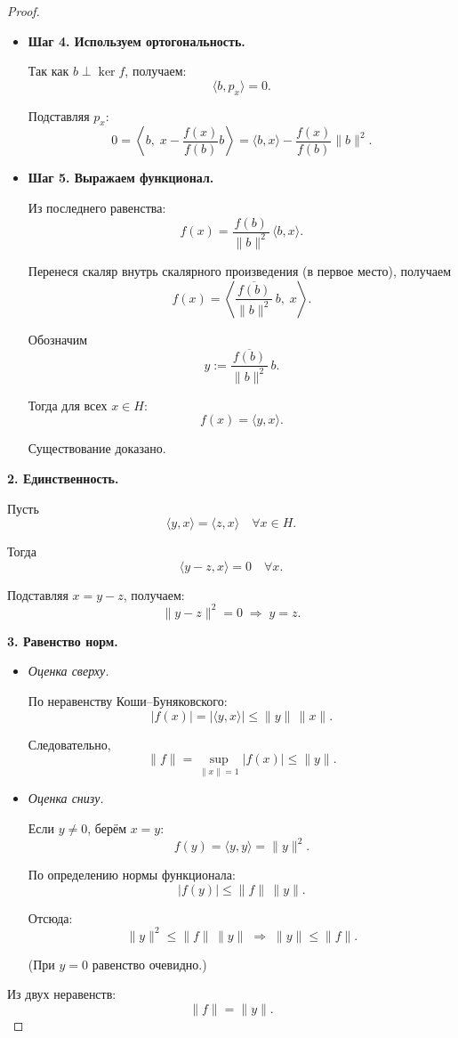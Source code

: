 \begin{proof}
\begin{itemize}
		\medskip
		
		\item \textbf{Шаг 4. Используем ортогональность.}
		
		Так как $b\perp\ker f$, получаем:
		$$
		\langle b,p_x\rangle=0.
		$$
		
		Подставляя $p_x$:
		$$
		0=\left\langle b,\;x-\frac{f(x)}{f(b)}b\right\rangle
		=\langle b,x\rangle-\frac{f(x)}{f(b)}\|b\|^2.
		$$
		
		\medskip
		
		\item \textbf{Шаг 5. Выражаем функционал.}
		
		Из последнего равенства:
		$$
		f(x)=\frac{f(b)}{\|b\|^2}\,\langle b,x\rangle.
		$$
		
		Перенеся скаляр внутрь скалярного произведения (в первое место), получаем
		$$
		f(x)=\left\langle
		\frac{\overline{f(b)}}{\|b\|^2}\,b,\;x
		\right\rangle.
		$$
		
		Обозначим
		$$
		y:=\frac{\overline{f(b)}}{\|b\|^2}\,b.
		$$
		
		Тогда для всех $x\in H$:
		$$
		f(x)=\langle y,x\rangle.
		$$
		
		Существование доказано.
		
	\end{itemize}
	
	\medskip
	
	\textbf{2. Единственность.}
	
	Пусть
	$$
	\langle y,x\rangle=\langle z,x\rangle
	\quad \forall x\in H.
	$$
	
	Тогда
	$$
	\langle y-z,x\rangle=0\quad \forall x.
	$$
	
	Подставляя $x=y-z$, получаем:
	$$
	\|y-z\|^2=0 \;\Rightarrow\; y=z.
	$$
	
	\medskip
	
	\textbf{3. Равенство норм.}
	
	\begin{itemize}
		
		\item \textit{Оценка сверху.}
		
		По неравенству Коши–Буняковского:
		$$
		|f(x)|=|\langle y,x\rangle|
		\le \|y\|\,\|x\|.
		$$
		
		Следовательно,
		$$
		\|f\|=\sup_{\|x\|=1}|f(x)|
		\le \|y\|.
		$$
		
		\medskip
		
		\item \textit{Оценка снизу.}
		
		Если $y\neq 0$, берём $x=y$:
		$$
		f(y)=\langle y,y\rangle=\|y\|^2.
		$$
		
		По определению нормы функционала:
		$$
		|f(y)|\le \|f\|\,\|y\|.
		$$
		
		Отсюда:
		$$
		\|y\|^2\le \|f\|\,\|y\|
		\;\Rightarrow\;
		\|y\|\le \|f\|.
		$$
		
		(При $y=0$ равенство очевидно.)
		
	\end{itemize}
	
	Из двух неравенств:
	$$
	\|f\|=\|y\|.
	$$
	
\end{proof}
